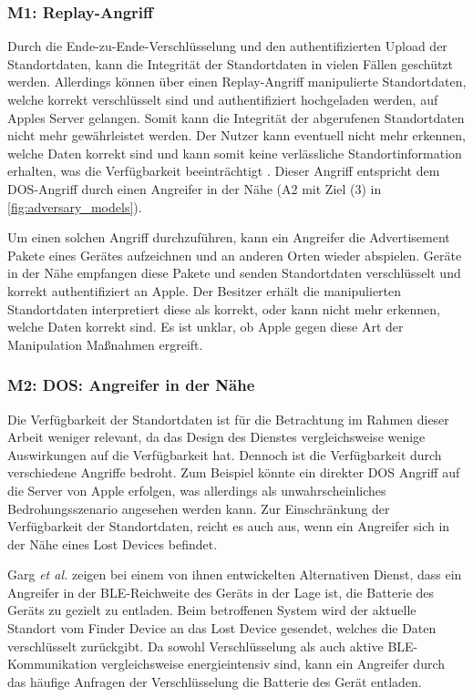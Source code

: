 \subsubsection[M1]{M1: Replay-Angriff}
\label{missbrauch:1}
Durch die Ende-zu-Ende-Verschlüsselung und den authentifizierten Upload der Standortdaten, kann die Integrität der Standortdaten in vielen Fällen geschützt werden.
Allerdings können über einen Replay-Angriff manipulierte Standortdaten, welche korrekt verschlüsselt sind und authentifiziert hochgeladen werden, auf Apples Server gelangen.
Somit kann die Integrität der abgerufenen Standortdaten nicht mehr gewährleistet werden.
Der Nutzer kann eventuell nicht mehr erkennen, welche Daten korrekt sind und kann somit keine verlässliche Standortinformation erhalten, was die Verfügbarkeit beeinträchtigt \cite{Heinrich_FindMy}.
Dieser Angriff entspricht dem \ac{DOS}-Angriff durch einen Angreifer in der Nähe (A2 mit Ziel (3) in \autoref{fig:adversary_models}).

Um einen solchen Angriff durchzuführen, kann ein Angreifer die Advertisement Pakete eines Gerätes aufzeichnen und an anderen Orten wieder abspielen.
Geräte in der Nähe empfangen diese Pakete und senden Standortdaten verschlüsselt und korrekt authentifiziert an Apple.
Der Besitzer erhält die manipulierten Standortdaten interpretiert diese als korrekt, oder kann nicht mehr erkennen, welche Daten korrekt sind.
Es ist unklar, ob Apple gegen diese Art der Manipulation Maßnahmen ergreift.


\subsubsection[M2]{M2: \ac{DOS}: Angreifer in der Nähe}
\label{missbrauch:2}
Die Verfügbarkeit der Standortdaten ist für die Betrachtung im Rahmen dieser Arbeit weniger relevant, da das Design des Dienstes vergleichsweise wenige Auswirkungen auf die Verfügbarkeit hat.
Dennoch ist die Verfügbarkeit durch verschiedene Angriffe bedroht.
Zum Beispiel könnte ein direkter \ac{DOS} Angriff auf die Server von Apple erfolgen, was allerdings als unwahrscheinliches Bedrohungsszenario angesehen werden kann.
Zur Einschränkung der Verfügbarkeit der Standortdaten, reicht es auch aus, wenn ein Angreifer sich in der Nähe eines Lost Devices befindet.

Garg \textit{et al.} \cite{Garg_Secure_Tracker} zeigen bei einem von ihnen entwickelten Alternativen Dienst, dass ein Angreifer in der \ac{BLE}-Reichweite des Geräts in der Lage ist, die Batterie des Geräts zu gezielt zu entladen.
Beim betroffenen System wird der aktuelle Standort vom Finder Device an das Lost Device gesendet, welches die Daten verschlüsselt zurückgibt.
Da sowohl Verschlüsselung als auch aktive \ac{BLE}-Kommunikation vergleichsweise energieintensiv sind, kann ein Angreifer durch das häufige Anfragen der Verschlüsselung die Batterie des Gerät entladen.

